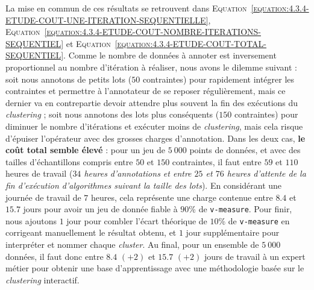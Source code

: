 			La mise en commun de ces résultats se retrouvent dans \textsc{Equation~\ref{equation:4.3.4-ETUDE-COUT-UNE-ITERATION-SEQUENTIELLE}}, \textsc{Equation~\ref{equation:4.3.4-ETUDE-COUT-NOMBRE-ITERATIONS-SEQUENTIEL}} et \textsc{Equation~\ref{equation:4.3.4-ETUDE-COUT-TOTAL-SEQUENTIEL}}.
			Comme le nombre de données à annoter est inversement proportionnel au nombre d'itération à réaliser, nous avons le dilemme suivant : soit nous annotons de petits lots ($50$ contraintes) pour rapidement intégrer les contraintes et permettre à l'annotateur de se reposer régulièrement, mais ce dernier va en contrepartie devoir attendre plus souvent la fin des exécutions du \textit{clustering} ; soit nous annotons des lots plus conséquents ($150$ contraintes) pour diminuer le nombre d'itérations et exécuter moins de \textit{clustering}, mais cela risque d'épuiser l'opérateur avec des grosses charges d'annotation.
			Dans les deux cas, \textbf{le coût total semble élevé} : pour un jeu de $5~000$ points de données, et avec des tailles d'échantillons compris entre $50$ et $150$ contraintes, il faut entre $59$ et $110$ heures de travail (\textit{$34$ heures d'annotations et entre $25$ et $76$ heures d'attente de la fin d'exécution d'algorithmes suivant la taille des lots}).
			En considérant une journée de travail de $7$ heures, cela représente une charge contenue entre $8.4$ et $15.7$ jours pour avoir un jeu de donnée fiable à $90$\% de \texttt{v-measure}.
			Pour finir, nous ajoutons $1$ jour pour combler l'écart théorique de $10$\% de \texttt{v-measure} en corrigeant manuellement le résultat obtenu, et $1$ jour supplémentaire pour interpréter et nommer chaque \textit{cluster}.
			Au final, pour un ensemble de $5~000$ données, il faut donc entre $8.4$ {\footnotesize $(+2)$} et $15.7$ {\footnotesize $(+2)$} jours de travail à un expert métier pour obtenir une base d'apprentissage avec une méthodologie basée sur le \textit{clustering} interactif.
			
